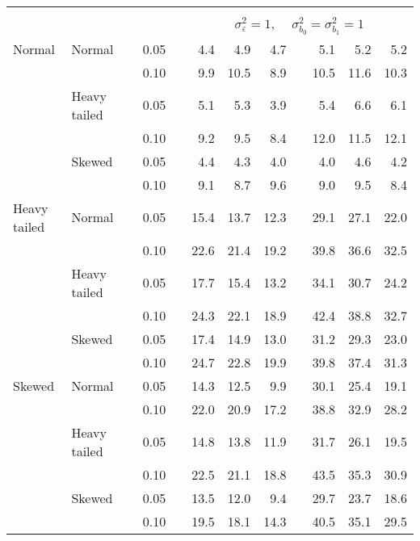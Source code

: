 \begin{table}[ht]
\begin{scriptsize}
\begin{center}
\begin{tabular}{ll p{.1cm} c p{.1cm} rrr p{.1cm} rrr}
&&&&&&&&&&&\\
& && && \multicolumn{7}{c}{$\sigma_{\varepsilon}^2 = 1$, \ \ $\sigma_{b_0}^2 = \sigma_{b_1}^2 = 1$} \\ \cline{6-12}
Normal       & Normal       && 0.05 &&   4.4 & 4.9 & 4.7 &   & 5.1 & 5.2 & 5.2 \\ 
             &              && 0.10 &&   9.9 & 10.5 & 8.9 &   & 10.5 & 11.6 & 10.3 \\ 
             & Heavy tailed && 0.05 &&   5.1 & 5.3 & 3.9 &   & 5.4 & 6.6 & 6.1 \\ 
             &              && 0.10 &&   9.2 & 9.5 & 8.4 &   & 12.0 & 11.5 & 12.1 \\ 
             & Skewed       && 0.05 &&   4.4 & 4.3 & 4.0 &   & 4.0 & 4.6 & 4.2 \\ 
             &              && 0.10 &&   9.1 & 8.7 & 9.6 &   & 9.0 & 9.5 & 8.4 \\ 
Heavy tailed & Normal       && 0.05 &&   15.4 & 13.7 & 12.3 &   & 29.1 & 27.1 & 22.0 \\ 
             &              && 0.10 &&   22.6 & 21.4 & 19.2 &   & 39.8 & 36.6 & 32.5 \\ 
             & Heavy tailed && 0.05 &&   17.7 & 15.4 & 13.2 &   & 34.1 & 30.7 & 24.2 \\ 
             &              && 0.10 &&   24.3 & 22.1 & 18.9 &   & 42.4 & 38.8 & 32.7 \\ 
             & Skewed       && 0.05 &&   17.4 & 14.9 & 13.0 &   & 31.2 & 29.3 & 23.0 \\ 
             &              && 0.10 &&   24.7 & 22.8 & 19.9 &   & 39.8 & 37.4 & 31.3 \\ 
Skewed       & Normal       && 0.05 &&   14.3 & 12.5 & 9.9 &   & 30.1 & 25.4 & 19.1 \\ 
             &              && 0.10 &&   22.0 & 20.9 & 17.2 &   & 38.8 & 32.9 & 28.2 \\ 
             & Heavy tailed && 0.05 &&   14.8 & 13.8 & 11.9 &   & 31.7 & 26.1 & 19.5 \\ 
             &              && 0.10 &&   22.5 & 21.1 & 18.8 &   & 43.5 & 35.3 & 30.9 \\ 
             & Skewed       && 0.05 &&   13.5 & 12.0 & 9.4 &   & 29.7 & 23.7 & 18.6 \\ 
             &              && 0.10 &&   19.5 & 18.1 & 14.3 &   & 40.5 & 35.1 & 29.5 \\ 


\end{tabular}
\end{center}
\end{scriptsize}
\end{table}
